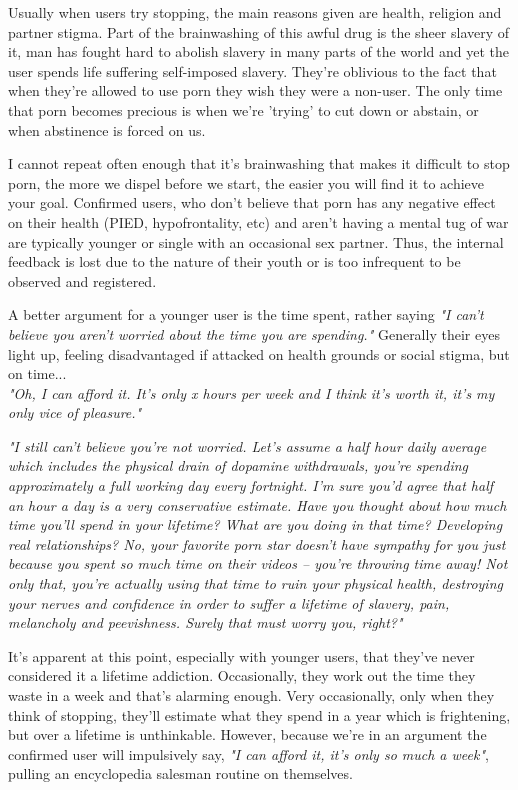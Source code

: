 \documentclass[easypeasy.tex]{subfiles}
\begin{document}
Usually when users try stopping, the main reasons given are health, religion and partner stigma. Part of the brainwashing of this awful drug is the sheer slavery of it, man has fought hard to abolish slavery in many parts of the world and yet the user spends life suffering self-imposed slavery. They're oblivious to the fact that when they're allowed to use porn they wish they were a non-user. The only time that porn becomes precious is when we're 'trying' to cut down or abstain, or when abstinence is forced on us.

I cannot repeat often enough that it's brainwashing that makes it difficult to stop porn, the more we dispel before we start, the easier you will find it to achieve your goal. Confirmed users, who don't believe that porn has any negative effect on their health (PIED, hypofrontality, etc) and aren't having a mental tug of war are typically younger or single with an occasional sex partner. Thus, the internal feedback is lost due to the nature of their youth or is too infrequent to be observed and registered.

A better argument for a younger user is the time spent, rather saying \textit{"I can't believe you aren't worried about the time you are spending."} Generally their eyes light up, feeling disadvantaged if attacked on health grounds or social stigma, but on time... \\
  \textit{"Oh, I can afford it. It's only x hours per week and I think it's worth it, it's my only vice of pleasure."}

\textit{"I still can't believe you're not worried. Let's assume a half hour daily average which includes the physical drain of dopamine withdrawals, you're spending approximately a full working day every fortnight. I'm sure you'd agree that half an hour a day is a very conservative estimate. Have you thought about how much time you'll spend in your lifetime? What are you doing in that time? Developing real relationships? No, your favorite porn star doesn't have sympathy for you just because you spent so much time on their videos -- you're throwing time away! Not only that, you're actually using that time to ruin your physical health, destroying your nerves and confidence in order to suffer a lifetime of slavery, pain, melancholy and peevishness. Surely that must worry you, right?"}

It's apparent at this point, especially with younger users, that they've never considered it a lifetime addiction. Occasionally, they work out the time they waste in a week and that's alarming enough. Very occasionally, only when they think of stopping, they'll estimate what they spend in a year which is frightening, but over a lifetime is unthinkable. However, because we're in an argument the confirmed user will impulsively say, \textit{"I can afford it, it's only so much a week"}, pulling an encyclopedia salesman routine on themselves.
\end{document}
